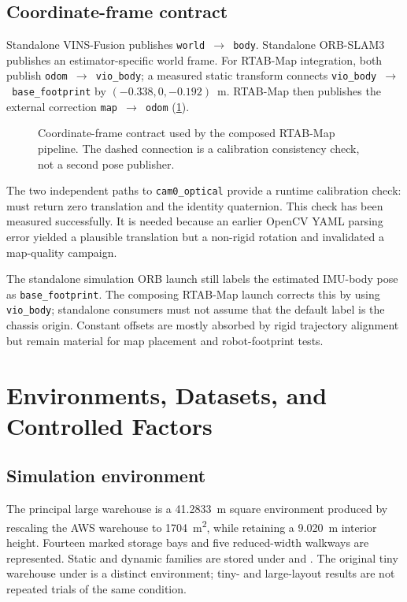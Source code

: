 \subsection{Coordinate-frame contract}

Standalone VINS-Fusion publishes \texttt{world~$\rightarrow$~body}. Standalone
ORB-SLAM3 publishes an estimator-specific world frame. For RTAB-Map integration,
both publish \texttt{odom~$\rightarrow$~vio\_body}; a measured static transform
connects \texttt{vio\_body~$\rightarrow$~base\_footprint} by
$(-0.338,0,-0.192)$~m. RTAB-Map then publishes the external correction
\texttt{map~$\rightarrow$~odom} (\cref{fig:frame-chain}).

\begin{figure}[htbp]
  \centering
  \resizebox{\textwidth}{!}{}
  \caption{Coordinate-frame contract used by the composed RTAB-Map pipeline. The
  dashed connection is a calibration consistency check, not a second pose
  publisher.}
  \label{fig:frame-chain}
\end{figure}

The two independent paths to \texttt{cam0\_optical} provide a runtime calibration
check:  must return zero translation and
the identity quaternion. This check has been measured successfully. It is needed
because an earlier OpenCV YAML parsing error yielded a plausible translation but
a non-rigid rotation and invalidated a map-quality campaign.

The standalone simulation ORB launch still labels the estimated IMU-body pose as
\texttt{base\_footprint}. The composing RTAB-Map launch corrects this by using
\texttt{vio\_body}; standalone consumers must not assume that the default label is
the chassis origin. Constant offsets are mostly absorbed by rigid trajectory
alignment but remain material for map placement and robot-footprint tests.

\section{Environments, Datasets, and Controlled Factors}
\label{sec:environments-datasets}

\subsection{Simulation environment}

The principal large warehouse is a \SI{41.2833}{\metre} square environment
produced by rescaling the AWS warehouse to \SI{1704}{\metre\squared}, while
retaining a \SI{9.020}{\metre} interior height. Fourteen marked storage bays and
five reduced-width walkways are represented. Static and dynamic families are
stored under  and
. The original tiny warehouse under
 is a distinct environment; tiny- and large-layout
results are not repeated trials of the same condition.

